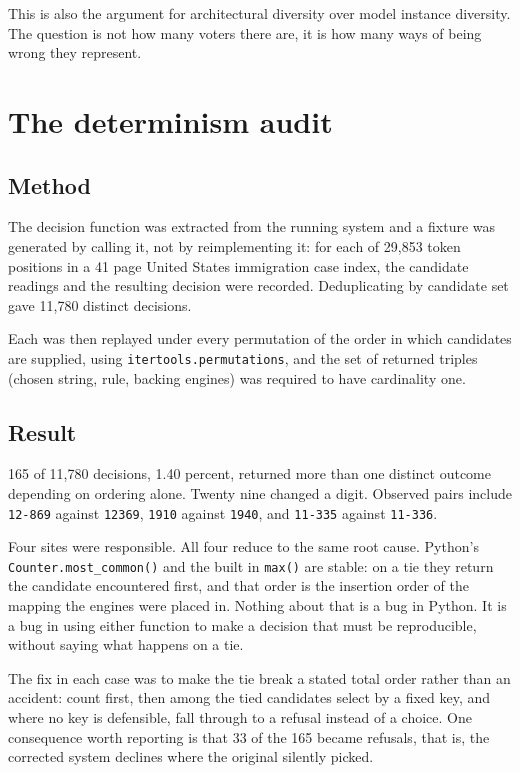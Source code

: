 \documentclass[11pt,a4paper]{article}
\begin{document}
This is also the argument for architectural diversity over model instance diversity. The
question is not how many voters there are, it is how many ways of being wrong they
represent.

\section{The determinism audit}
\label{sec:audit}

\subsection{Method}

The decision function was extracted from the running system and a fixture was generated
by calling it, not by reimplementing it: for each of 29{,}853 token positions in a 41 page
United States immigration case index, the candidate readings and the resulting decision
were recorded. Deduplicating by candidate set gave 11{,}780 distinct decisions.

Each was then replayed under every permutation of the order in which candidates are
supplied, using \texttt{itertools.permutations}, and the set of returned triples
(chosen string, rule, backing engines) was required to have cardinality one.

\subsection{Result}

165 of 11{,}780 decisions, 1.40 percent, returned more than one distinct outcome
depending on ordering alone. Twenty nine changed a digit. Observed pairs include
\texttt{12-869} against \texttt{12369}, \texttt{1910} against \texttt{1940}, and
\texttt{11-335} against \texttt{11-336}.

Four sites were responsible. All four reduce to the same root cause. Python's
\texttt{Counter.\allowbreak most\_common()} and the built in \texttt{max()} are stable:
on a tie they return the candidate encountered first, and that order is the insertion
order of the mapping the engines were placed in. Nothing about that is a bug in Python. It is a
bug in using either function to make a decision that must be reproducible, without saying
what happens on a tie.

The fix in each case was to make the tie break a stated total order rather than an
accident: count first, then among the tied candidates select by a fixed key, and where no
key is defensible, fall through to a refusal instead of a choice. One consequence worth
reporting is that 33 of the 165 became refusals, that is, the corrected system declines
where the original silently picked.
\end{document}
